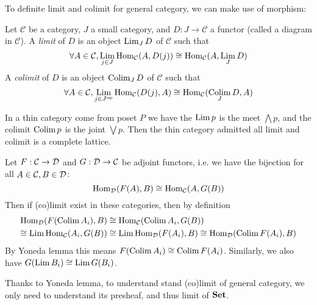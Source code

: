 To definite limit and colimit for general category, we can make use of morphism:
\begin{definition}
  Let $\mathcal{C}$ be a category, $J$ a small category, and $D : J \to \mathcal{C}$ a functor (called a diagram in $\mathcal{C}$). A \emph{limit} of $D$ is an object $\operatorname*{\mathrm{Lim}}_J D$ of $\mathcal{C}$ such that 
\[
  \forall A\in \mathcal{C}, \operatorname*{\mathrm{Lim}}_{j\in J} \mathrm{Hom}_{\mathcal{C}}(A, D(j) ) \cong \mathrm{Hom}_{\mathcal{C}}(A, \operatorname*{\mathrm{Lim}}_{J} D)
\]
A \emph{colimit} of $D$ is an object $\operatorname*{\mathrm{Colim}}_J D$ of $\mathcal{C}$ such that
\[
  \forall A\in \mathcal{C}, \operatorname*{\mathrm{Lim}}_{j\in J^{\mathrm{op}}} \mathrm{Hom}_{\mathcal{C}}(D(j) , A) \cong \mathrm{Hom}_{\mathcal{C}}(\operatorname*{\mathrm{Colim}}_{ J} D, A)
\]
\end{definition}
\begin{example}
 In a thin category come from poset $P$ we have the $\operatorname*{\mathrm{Lim}} p $ is the meet $\bigwedge p$, and the colimit $\operatorname*{\mathrm{Colim}} p$ is the joint $ \bigvee p$. Then the thin category admitted all limit and colimit is a complete lattice.
\end{example}
\begin{remark}
  Let $F:\mathcal{C} \to \mathcal{D}$ and $G:\mathcal{D} \to \mathcal{C}$ be adjoint functors, i.e. we have the bijection for all $A\in \mathcal{C}, B \in \mathcal{D}$:
  \[
    \mathrm{Hom}_{\mathcal{D}}(F(A),B)\cong \mathrm{Hom}_{\mathcal{C}}(A,G(B)) 
  \]
  Then if (co)limit exist in these categories, then by definition
  \begin{align*}
     \mathrm{Hom}_{\mathcal{D}}(F(\operatorname*{\mathrm{Colim}} A_i),B) &\cong \mathrm{Hom}_{\mathcal{C}}(\operatorname*{\mathrm{Colim}} A_i,G(B))\\
    \cong \operatorname*{\mathrm{Lim}} \mathrm{Hom}_{\mathcal{C}}( A_i,G(B)) & \cong  \operatorname*{\mathrm{Lim}} \mathrm{Hom}_{\mathcal{D}}( F(A_i),B)\cong   \mathrm{Hom}_{\mathcal{D}}(\operatorname*{\mathrm{Colim}} F(A_i),B)
  \end{align*}
  By Yoneda lemma this means $F(\operatorname*{\mathrm{Colim}} A_i)\cong \operatorname*{\mathrm{Colim}} F(A_i)$. Similarly, we also have $G(\operatorname*{\mathrm{Lim}} B_i) \cong \operatorname*{\mathrm{Lim}} G( B_i)$.
\end{remark}

Thanks to Yoneda lemma, to understand stand (co)limit of general category, we only need to understand its presheaf, and thus limit of $\mathbf{Set}$.


